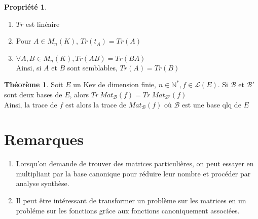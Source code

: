 \documentclass[fleqn]{article}
\theoremstyle{definition} \newtheorem*{defi}{D\'efinition}
\theoremstyle{definition} \newtheorem*{theo}{Th\'eor\`eme}
\theoremstyle{definition} \newtheorem*{coro}{Corollaire}
\theoremstyle{definition} \newtheorem*{nota}{Notation}
\theoremstyle{definition} \newtheorem*{vocab}{Vocabulaire}
\theoremstyle{remark} \newtheorem*{rqs}{Remarques}
\theoremstyle{definition} \newtheorem*{prop}{Propri\'et\'e}
\begin{document}
\begin{prop} $ $
	\begin{enumerate}
		\item $Tr$ est lin\'eaire
		\item Pour $A \in M_n(K)$, $Tr(t_A) = Tr(A)$
		\item $\forall A,B \in M_n(K), Tr(AB) = Tr(BA)$ \\
			Ainsi, si $A$ et $B$ sont semblables, $Tr(A) = Tr(B)$
	\end{enumerate}
\end{prop}

\begin{theo}
	Soit $E$ un Kev de dimension finie, $n \in \mathbb{N}^*, f \in \mathscr{L}(E)$. Si $\mathscr{B}$ et $\mathscr{B}'$ sont deux bases de $E$,
	alors $Tr\ Mat_{\mathscr{B}}(f) = Tr\ Mat_{\mathscr{B}'}(f)$ \\
	Ainsi, la trace de $f$ est alors la trace de $Mat_{\mathscr{B}}(f)$ o\`u $\mathscr{B}$ est une base qlq de $E$
\end{theo}

\section{Remarques}

\begin{enumerate}
	\item Lorsqu'on demande de trouver des matrices particuli\`eres, on peut essayer en multipliant par la base canonique pour r\'eduire leur
		nombre et proc\'eder par analyse synth\`ese.
	\item Il peut \^etre int\'eressant de transformer un probl\`eme sur les matrices en un probl\'eme sur les fonctions gr\^ace aux fonctions
		canoniquement associ\'ees.
\end{enumerate}
\end{document}
